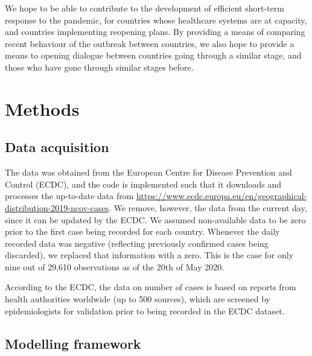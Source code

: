 \documentclass[fleqn,10pt]{wlscirep}
\begin{document}
We hope to be able to contribute to the development of efficient short-term response to the pandemic, for countries whose healthcare systems are at capacity, and countries implementing reopening plans. By providing a means of comparing recent behaviour of the outbreak between countries, we also hope to provide a means to opening dialogue between countries going through a similar stage, and those who have gone through similar stages before.

\section*{Methods}

\subsection*{Data acquisition}

The data was obtained from the European Centre for Disease Prevention and Control (ECDC), and the code is implemented such that it downloads and processes the up-to-date data from \href{https://www.ecdc.europa.eu/en/geographical-distribution-2019-ncov-cases}{https://www.ecdc.europa.eu/en/geographical-distribution-2019-ncov-cases}. We remove, however, the data from the current day, since it can be updated by the ECDC. We assumed non-available data to be zero prior to the first case being recorded for each country. Whenever the daily recorded data was negative (reflecting previously confirmed cases being discarded), we replaced that information with a zero. This is the case for only nine out of 29,610 observations as of the 20th of May 2020.

According to the ECDC, the data on number of cases is based on reports from health authorities worldwide (up to 500 sources), which are screened by epidemiologists for validation prior to being recorded in the ECDC dataset.

\subsection*{Modelling framework}
\end{document}
